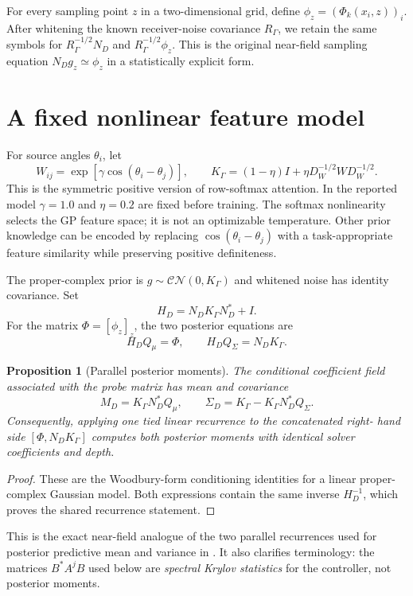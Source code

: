 \documentclass[10pt]{article}
\newtheorem{proposition}{Proposition}
\begin{document}
For every sampling point $z$ in a two-dimensional grid, define
$\phi_z=(\Phi_k(x_i,z))_i$.  After whitening the known receiver-noise
covariance $R_\Gamma$, we retain the same symbols for
$R_\Gamma^{-1/2}N_D$ and $R_\Gamma^{-1/2}\phi_z$.  This is the original
near-field sampling equation $N_Dg_z\simeq\phi_z$ in a statistically explicit
form.

\section{A fixed nonlinear feature model}
For source angles $\theta_i$, let
\[
 W_{ij}=\exp\!\left[\gamma\cos(\theta_i-\theta_j)\right],\qquad
 K_\Gamma=(1-\eta)I+\eta D_W^{-1/2}WD_W^{-1/2}.
\]
This is the symmetric positive version of row-softmax attention.  In the
reported model $\gamma=1.0$ and
$\eta=0.2$ are fixed before training.  The softmax
nonlinearity selects the GP feature space; it is not an optimizable temperature.
Other prior knowledge can be encoded by replacing $\cos(\theta_i-\theta_j)$
with a task-appropriate feature similarity while preserving positive
definiteness.

The proper-complex prior is $g\sim\mathcal{CN}(0,K_\Gamma)$ and whitened
noise has identity covariance.  Set
\[
 H_D=N_DK_\Gamma N_D^*+I.
\]
For the matrix $\Phi=[\phi_z]_z$, the two posterior equations are
\begin{equation}\label{eq:two-solves}
 H_DQ_\mu=\Phi,
 \qquad H_DQ_\Sigma=N_DK_\Gamma.
\end{equation}

\begin{proposition}[Parallel posterior moments]\label{prop:moments}
The conditional coefficient field associated with the probe matrix has mean
and covariance
\[
 M_D=K_\Gamma N_D^*Q_\mu,
 \qquad
 \Sigma_D=K_\Gamma-K_\Gamma N_D^*Q_\Sigma.
\]
Consequently, applying one tied linear recurrence to the concatenated right-
hand side $[\Phi,N_DK_\Gamma]$ computes both posterior moments with identical
solver coefficients and depth.
\end{proposition}
\begin{proof}
These are the Woodbury-form conditioning identities for a linear proper-
complex Gaussian model.  Both expressions contain the same inverse $H_D^{-1}$,
which proves the shared recurrence statement.
\end{proof}

This is the exact near-field analogue of the two parallel recurrences used for
posterior predictive mean and variance in \citet{kang2026}.  It also clarifies
terminology: the matrices $B^*A^jB$ used below are \emph{spectral Krylov
statistics} for the controller, not posterior moments.
\end{document}

